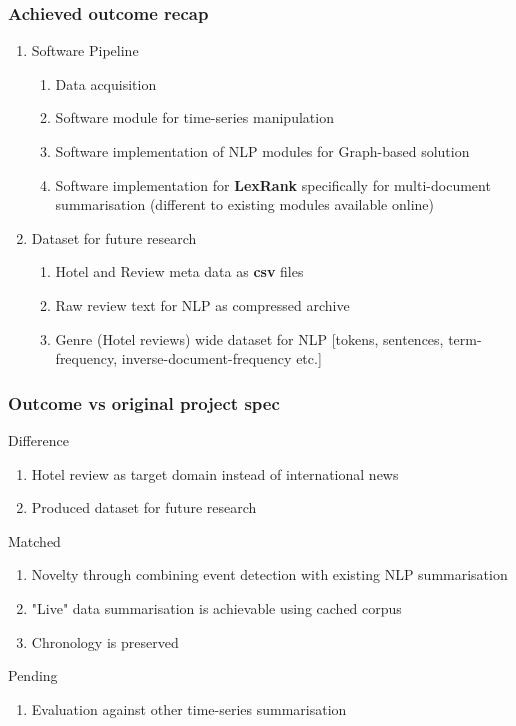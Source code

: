 \documentclass[xetex,mathserif,serif]{beamer}
\begin{document}
\begin{frame}
	\frametitle{Achieved outcome recap}
\begin{enumerate}
		\item Software Pipeline
	\begin{enumerate}
		\item Data acquisition
		\item Software module for time-series manipulation
		\item Software implementation of NLP modules for Graph-based solution
		\item Software implementation for \textbf{LexRank} specifically for multi-document summarisation (different to existing modules available online)
	\end{enumerate}
	
	\item Dataset for future research
	\begin{enumerate}
		\item Hotel and Review meta data as \textbf{csv} files
		\item Raw review text for NLP as compressed archive
		\item Genre (Hotel reviews) wide dataset for NLP [tokens, sentences, term-frequency, inverse-document-frequency etc.]

	\end{enumerate}
	
\end{enumerate}
\end{frame}
\begin{frame}
	\frametitle{Outcome vs original project spec}
	Difference
	\begin{enumerate}
	\item Hotel review as target domain instead of international news
	\item Produced dataset for future research
	\end{enumerate}
	Matched
	\begin{enumerate}
	\item Novelty through combining event detection with existing NLP summarisation
	\item "Live" data summarisation is achievable using cached corpus
	\item Chronology is preserved
	\end{enumerate}
	Pending
	\begin{enumerate}
		\item Evaluation against other time-series summarisation
	\end{enumerate}
\end{frame}
\end{document}
